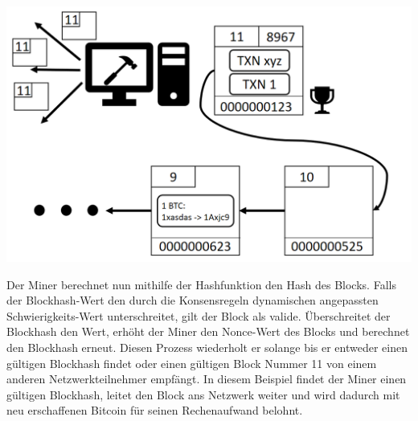 \vspace{1cm}
\begin{minipage}{0.55\textwidth}
\includegraphics[width=\textwidth]{Figures/konzept_btc/konzept5}
\centering
\decoRule
{}
\label{fig:konzept5}
\end{minipage}
\begin{minipage}{0.45\textwidth}
Der Miner berechnet nun mithilfe der Hashfunktion den Hash des Blocks. Falls der Blockhash-Wert den durch die Konsensregeln dynamischen angepassten Schwierigkeits-Wert unterschreitet, gilt der Block als valide. Überschreitet der Blockhash den Wert, erhöht der Miner den Nonce-Wert des Blocks und berechnet den Blockhash erneut. Diesen Prozess wiederholt er solange bis er entweder einen gültigen Blockhash findet oder einen gültigen Block Nummer 11 von einem anderen Netzwerkteilnehmer empfängt.
In diesem Beispiel findet der Miner einen gültigen Blockhash, leitet den Block ans Netzwerk weiter und wird dadurch mit neu erschaffenen Bitcoin für seinen Rechenaufwand belohnt.
\end{minipage}

